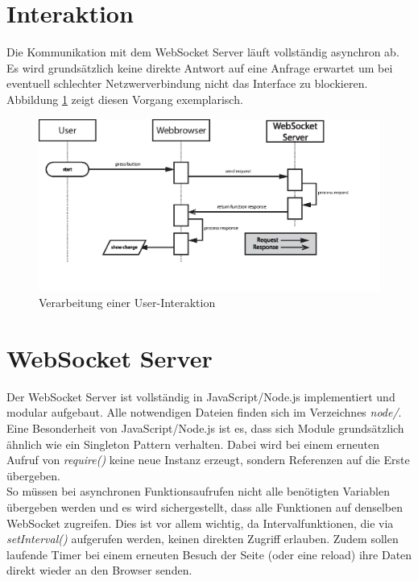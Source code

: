 \section{Interaktion}
Die Kommunikation mit dem WebSocket Server läuft vollständig asynchron ab. Es wird grundsätzlich keine direkte Antwort auf eine Anfrage erwartet um bei eventuell schlechter Netzwerverbindung nicht das Interface zu blockieren. Abbildung \ref{fig:interaction} zeigt diesen Vorgang exemplarisch.

\begin{figure}[ht]
  \includegraphics[width = \textwidth]{documentation/images/sendRequest.eps}
  \caption{Verarbeitung einer User-Interaktion}
  \label{fig:interaction}
\end{figure}


\section{WebSocket Server}
Der WebSocket Server ist vollständig in JavaScript/Node.js implementiert und modular aufgebaut. Alle notwendigen Dateien finden sich im Verzeichnes \textit{node/}.\\
Eine Besonderheit von JavaScript/Node.js ist es, dass sich Module grundsätzlich ähnlich wie ein Singleton Pattern verhalten. Dabei wird bei einem erneuten Aufruf von \textit{require()} keine neue Instanz erzeugt, sondern Referenzen auf die Erste übergeben.\\
So müssen bei asynchronen Funktionsaufrufen nicht alle benötigten Variablen übergeben werden und es wird sichergestellt, dass alle Funktionen auf denselben WebSocket zugreifen. Dies ist vor allem wichtig, da Intervalfunktionen, die via \textit{setInterval()} aufgerufen werden, keinen direkten Zugriff erlauben. Zudem sollen laufende Timer bei einem erneuten Besuch der Seite (oder eine reload) ihre Daten direkt wieder an den Browser senden.\\

